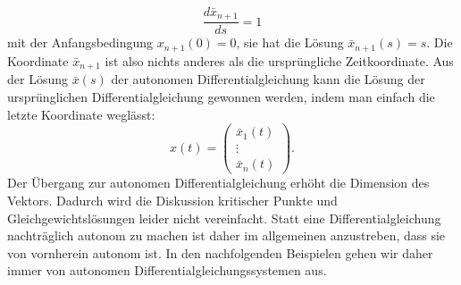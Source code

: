 \[
\frac{d\bar x_{n+1}}{ds} = 1
\]
mit der Anfangsbedingung $x_{n+1}(0)=0$, sie hat die Lösung
$\bar x_{n+1}(s)=s$.
Die Koordinate $\bar x_{n+1}$ ist also nichts anderes als die
ursprüngliche Zeitkoordinate.
Aus der Lösung $\bar x(s)$ der autonomen Differentialgleichung
kann die Lösung der ursprünglichen Differentialgleichung gewonnen
werden, indem man einfach die letzte Koordinate weglässt:
\[
x(t)
=
\begin{pmatrix}
\bar x_1(t) \\ \vdots \\ \bar x_n(t)
\end{pmatrix}.
\]
Der Übergang zur autonomen Differentialgleichung erhöht die Dimension
des Vektors.
Dadurch wird die Diskussion kritischer Punkte und Gleichgewichtslösungen
leider nicht vereinfacht.
Statt eine Differentialgleichung nachträglich autonom zu machen
ist daher im allgemeinen anzustreben, dass sie von vornherein
autonom ist.
In den nachfolgenden Beispielen gehen wir daher immer von autonomen
Differentialgleichungssystemen aus.



